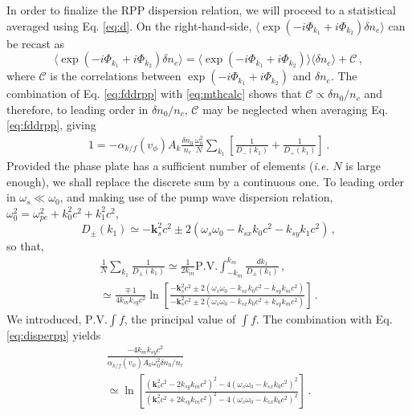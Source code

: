 \documentclass[
 reprint,
 superscriptaddress,
 amsmath,amssymb,
 aps,
]{revtex4-1}
\begin{document}
In order to finalize the RPP dispersion relation, we will proceed to a statistical averaged using Eq. \eqref{eq:d}. On the right-hand-side,  $\langle\exp(-i\Phi_{k_1}+i\Phi_{k_2})\delta n_e \rangle$ can be recast as
\begin{equation}
\langle\exp(-i\Phi_{k_1}+i\Phi_{k_2})\delta n_e \rangle= \langle\exp(-i\Phi_{k_1}+i\Phi_{k_2}) \rangle\langle\delta n_e \rangle + \mathcal{C}\, , \label{eq:mthcalc}
\end{equation}
where $\mathcal{C}$ is the correlations   between  \mbox{$\exp(-i\Phi_{k_1}+i\Phi_{k_2})$} and $\delta n_e$. The combination of Eq. \eqref{eq:fddrpp} with \eqref{eq:mthcalc} shows that $\mathcal{C}\propto \delta n_0/n_c$ and therefore, to leading order in $\delta n_0/n_c$, $\mathcal{C}$ may  be neglected when  averaging   Eq. \eqref{eq:fddrpp}, giving
\begin{align}
  1= -\alpha_{k/f}(v_\phi)A_k \frac{\delta n_0}{n_c} \frac{\omega_0^2}{N}\sum_{ k_{1} }        \left[ \frac{1 }{D_-(k_{1})} +\frac{1}{D_+(k_{1})} \right] \, .\label{eq:disperpp} 
\end{align}
Provided the phase plate has a sufficient number of elements (\emph{i.e.} $N$ is large enough), we shall replace the discrete sum by a continuous one. To leading order 
in  $\omega_s\ll\omega_0$, and making use of the pump wave dispersion relation, $\omega_0^2=\omega_{pe}^2+k_0^2c^2+k_1^2c^2$,
\begin{equation}\label{eq:dpmk1}
D_\pm(k_1) \simeq -\mathbf{k}_s^2c^2\pm 2(\omega_s\omega_0 - k_{sx}k_0 c^2-k_{sy} k_1 c^2) \, , 
\end{equation} 
so that,
\begin{align}
 \frac{1}{N} \sum_{ k_{1} }  \frac{1 }{D_\pm(k_{1})}  \simeq \frac{1}{2k_m} \mathrm{P.V.} \int_{ -k_m }^{ k_m }       \frac{dk_1 }{D_\pm(k_{1})}  \, , \nonumber\\
 \simeq \frac{\mp\,1}{4k_mk_{sy}c^2} \ln\left[
 \frac{ -\mathbf{k}_s^2c^2\pm 2(\omega_s\omega_0 - k_{sx}k_0 c^2-k_{sy} k_m c^2)}{ -\mathbf{k}_s^2c^2\pm 2(\omega_s\omega_0 - k_{sx}k_0 c^2+k_{sy} k_m c^2)} \right] \, .\label{eq:sumint} 
\end{align}
We introduced, $\mathrm{P.V.}\int f$, the principal value of $\int f$.
The combination with Eq. \eqref{eq:disperpp} yields
\begin{align}
 \frac{-4k_mk_{sy}c^2}{\alpha_{k/f}(v_\phi)A_k \omega_0^2\delta n_0/n_c  } \nonumber\\
 \simeq  \ln\left[
 \frac{ (\mathbf{k}_s^2c^2-2k_{sy} k_m c^2)^2 -4(\omega_s\omega_0 - k_{sx}k_0 c^2)^2}{ (\mathbf{k}_s^2c^2+2k_{sy} k_m c^2)^2 -4(\omega_s\omega_0 - k_{sx}k_0 c^2)^2} \right] \, .\label{eq:disperpp2} 
\end{align}
\end{document}
